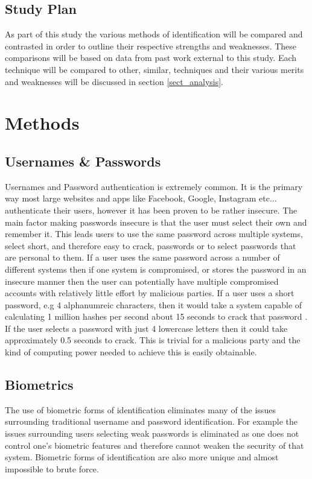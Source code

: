 \documentclass[12pt]{article}
\begin{document}
	\subsection{Study Plan}
	As part of this study the various methods of identification will be compared and contrasted in order to outline their respective strengths and weaknesses. These comparisons will be based on data from past work external to this study.
	Each technique will be compared to other, similar, techniques and their various merits and weaknesses will be discussed in section \ref{sect_analysis}.
	
	\section{Methods}
	\label{sect_methods}
	\subsection{Usernames \& Passwords}
	Usernames and Password authentication is extremely common. It is the primary way most large websites and apps like Facebook, Google, Instagram etc... authenticate their users, however it has been proven to be rather insecure. The main factor making passwords insecure is that the user must select their own and remember it. This leads users to use the same password across multiple systems, select short, and therefore easy to crack, passwords or to select passwords that are personal to them.
	If a user uses the same password across a number of different systems then if one system is compromised, or stores the password in an insecure manner then the user can potentially have multiple compromised accounts with relatively little effort by malicious parties.
	If a user uses a short password, e.g 4 alphanumreic characters, then it would take a system capable of calculating 1 million hashes per second about 15 seconds to crack that password \citep{kessler1996passwords}. If the user selects a password with just 4 lowercase letters then it could take approximately 0.5 seconds to crack. This is trivial for a malicious party and the kind of computing power needed to achieve this is easily obtainable.
	\subsection{Biometrics}
	\label{subsect_biometrics}
	The use of biometric forms of identification eliminates many of the issues surrounding traditional username and password identification. For example the issues surrounding users selecting weak passwords is eliminated as one does not control one's biometric features and therefore cannot weaken the security of that system. Biometric forms of identification are also more unique and almost impossible to brute force.
\end{document}
